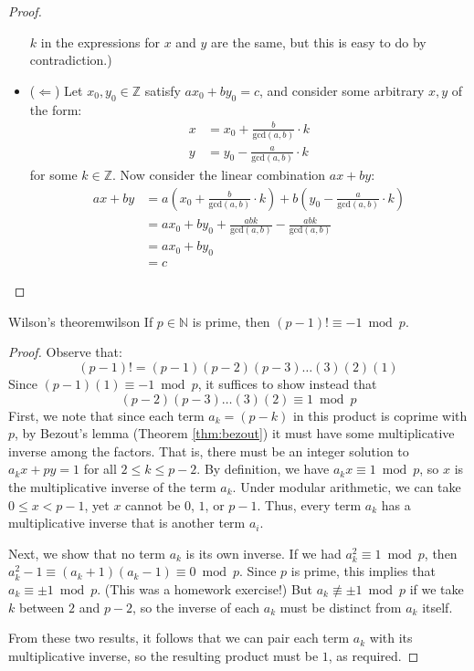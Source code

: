 \documentclass{article}
\theoremstyle{definition}
\def\gcd{\textrm{gcd}}
\begin{document}
\begin{proof}
\begin{itemize}
      $k$ in the expressions for $x$ and $y$ are the same, but this is easy to
      do by contradiction.)
    \item ($\Longleftarrow$) Let $x_0, y_0 \in \mathbb{Z}$ satisfy
      $ax_0 + by_0 = c$, and consider some arbitrary $x,y$ of the form:
      \begin{align*}
        x &= x_0 + \frac{b}{\gcd(a,b)} \cdot k \\
        y &= y_0 - \frac{a}{\gcd(a,b)} \cdot k
      \end{align*}
      for some $k \in \mathbb{Z}$. Now consider the linear combination $ax+by$:
      \begin{align*}
        ax + by &= a\left(x_0 + \frac{b}{\gcd(a,b)} \cdot k\right)
                 + b\left(y_0 - \frac{a}{\gcd(a,b)} \cdot k\right)           \\
                &= ax_0 + by_0 + \frac{abk}{\gcd(a,b)}-\frac{abk}{\gcd(a,b)} \\
                &= ax_0 + by_0                                               \\
                &= c
      \end{align*}
  \end{itemize}
\end{proof}

\begin{theorem}{Wilson's theorem}{wilson}
  If $p \in \mathbb{N}$ is prime, then $(p-1)! \equiv -1 \bmod p$.
\end{theorem}
\begin{proof}
  Observe that:
  \begin{equation*}
    (p-1)! = (p-1)(p-2)(p-3)\dots(3)(2)(1)
  \end{equation*}
  Since $(p-1)(1) \equiv -1 \bmod p$, it suffices to show instead that
  \begin{equation*}
    (p-2)(p-3)\dots(3)(2) \equiv 1 \bmod p
  \end{equation*}
  First, we note that since each term $a_k = (p-k)$ in this product is coprime
  with $p$, by Bezout's lemma (Theorem \ref{thm:bezout}) it must have some
  multiplicative inverse among the factors. That is, there must be an integer
  solution to $a_kx + py = 1$ for all $2 \le k \le p - 2$. By definition, we
  have $a_kx \equiv 1 \bmod p$, so $x$ is the multiplicative inverse of the
  term $a_k$. Under modular arithmetic, we can take $0 \le x < p-1$, yet $x$
  cannot be $0$, $1$, or $p-1$. Thus, every term $a_k$ has a multiplicative
  inverse that is another term $a_i$.

  Next, we show that no term $a_k$ is its own inverse. If we had
  $a_k^2 \equiv 1 \bmod p$, then $a_k^2-1 \equiv (a_k+1)(a_k-1) \equiv 0
  \bmod p$. Since $p$ is prime, this implies that $a_k \equiv \pm 1 \bmod p$.
  (This was a homework exercise!) But $a_k \not\equiv \pm 1 \bmod p$ if we take
  $k$ between $2$ and $p-2$, so the inverse of each $a_k$ must be distinct from
  $a_k$ itself.

  From these two results, it follows that we can pair each term $a_k$ with its
  multiplicative inverse, so the resulting product must be $1$, as required.
\end{proof}
\end{document}

